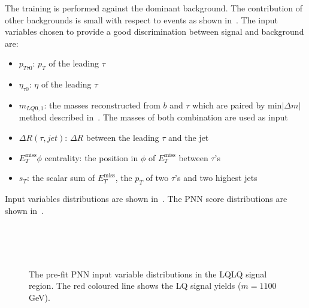 \subsubsection{\hadhad}
The training is performed against the dominant \ttbar background. The contribution of other backgrounds is small with respect to \ttbar events as shown in~. The input variables chosen to provide a good discrimination between signal and background are:
\begin{itemize}
    \item $p_{T\tau 0}$: $p_T$ of the leading $\tau$
    \item ${\eta_{\tau 0}}$: $\eta$ of the leading $\tau$
    \item $m_{LQ0,1}$: the masses reconstructed from $b$ and $\tau$ which are paired by $\mathrm{min}|\Delta m|$ method described in~. The masses of both combination are used as input
    \item $\Delta R(\tau, jet)$: $\Delta R$ between the leading $\tau$ and the jet
    \item $E_{T}^{\mathrm{miss}} \phi$ centrality: the position in $\phi$ of $E_{T}^{\mathrm{miss}}$ between $\tau$'s
    \item $s_{T}$: the scalar sum of $E_{T}^{\mathrm{miss}}$, the $p_{T}$ of two $\tau$'s and two highest jets
\end{itemize}

Input variables distributions are shown in~. The PNN score distributions are shown in~.

\begin{figure}[]
    \centering
     \\
     \\
     \\
    \caption{ 
     The pre-fit PNN input variable distributions in the LQLQ \hadhad signal region. The red coloured line shows the LQ \hadhad signal yields ($m=1100$ GeV).
    }
     \label{fig:PNN_input_hadhad}
\end{figure}



